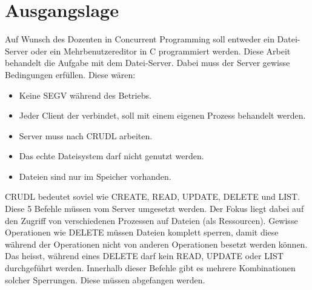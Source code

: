 \documentclass[12pt,a4paper,ngerman]{report}
\begin{document}
\chapter*{Ausgangslage}
Auf Wunsch des Dozenten in Concurrent Programming soll entweder ein Datei-Server oder ein Mehrbenutzereditor in C programmiert werden. Diese Arbeit behandelt die Aufgabe mit dem Datei-Server. Dabei muss der Server gewisse Bedingungen erfüllen. Diese wären:
\begin{itemize}
	\item Keine SEGV während des Betriebs.
	\item Jeder Client der verbindet, soll mit einem eigenen Prozess behandelt werden.
	\item Server muss nach CRUDL arbeiten.
	\item Das echte Dateisystem darf nicht genutzt werden.
	\item Dateien sind nur im Speicher vorhanden.
\end{itemize}

CRUDL bedeutet soviel wie CREATE, READ, UPDATE, DELETE und LIST. Diese 5 Befehle müssen vom Server umgesetzt werden. Der Fokus liegt dabei auf den Zugriff von verschiedenen Prozessen auf Dateien (als Ressourcen). Gewisse Operationen wie DELETE müssen Dateien komplett sperren, damit diese während der Operationen nicht von anderen Operationen besetzt werden können. Das heisst, während eines DELETE darf kein READ, UPDATE oder LIST durchgeführt werden. Innerhalb dieser Befehle gibt es mehrere Kombinationen solcher Sperrungen. Diese müssen abgefangen werden.
\end{document}
